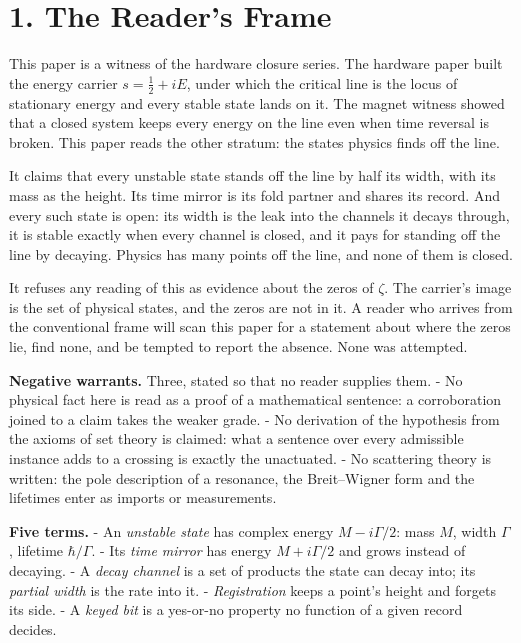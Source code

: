 \documentclass[10pt]{article}
\begin{document}
\hypertarget{the-readers-frame}{%
\section{1. The Reader's Frame}\label{the-readers-frame}}

This paper is a witness of the hardware closure series. The hardware
paper built the energy carrier \(s=\tfrac12+iE\), under which the
critical line is the locus of stationary energy and every stable state
lands on it. The magnet witness showed that a closed system keeps every
energy on the line even when time reversal is broken. This paper reads
the other stratum: the states physics finds off the line.

It claims that every unstable state stands off the line by half its
width, with its mass as the height. Its time mirror is its fold partner
and shares its record. And every such state is open: its width is the
leak into the channels it decays through, it is stable exactly when
every channel is closed, and it pays for standing off the line by
decaying. Physics has many points off the line, and none of them is
closed.

It refuses any reading of this as evidence about the zeros of \(\zeta\).
The carrier's image is the set of physical states, and the zeros are not
in it. A reader who arrives from the conventional frame will scan this
paper for a statement about where the zeros lie, find none, and be
tempted to report the absence. None was attempted.

\textbf{Negative warrants.} Three, stated so that no reader supplies
them. - No physical fact here is read as a proof of a mathematical
sentence: a corroboration joined to a claim takes the weaker grade. - No
derivation of the hypothesis from the axioms of set theory is claimed:
what a sentence over every admissible instance adds to a crossing is
exactly the unactuated. - No scattering theory is written: the pole
description of a resonance, the Breit--Wigner form and the lifetimes
enter as imports or measurements.

\textbf{Five terms.} - An \emph{unstable state} has complex energy
\(M-i\Gamma/2\): mass \(M\), width \(\Gamma\), lifetime
\(\hbar/\Gamma\). - Its \emph{time mirror} has energy \(M+i\Gamma/2\)
and grows instead of decaying. - A \emph{decay channel} is a set of
products the state can decay into; its \emph{partial width} is the rate
into it. - \emph{Registration} keeps a point's height and forgets its
side. - A \emph{keyed bit} is a yes-or-no property no function of a
given record decides.
\end{document}
